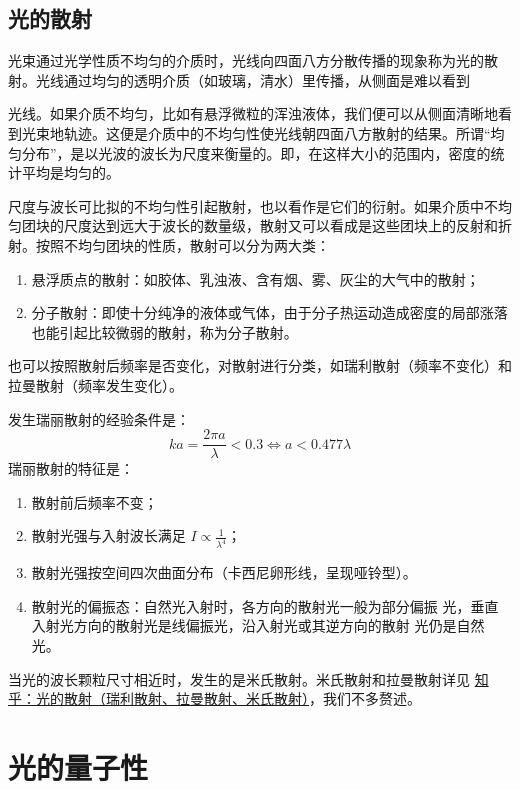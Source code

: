 \documentclass[UTF8]{report}
\theoremstyle{MyLineTheoremStyle} %
\theoremstyle{MyBlockTheoremStyle} %
\theoremstyle{MySubsubsectionStyle} %
\begin{document}
\section{光的散射}

光束通过光学性质不均匀的介质时，光线向四面八方分散传播的现象称为光的散射。光线通过均匀的透明介质（如玻璃，清水）里传播，从侧面是难以看到

光线。如果介质不均匀，比如有悬浮微粒的浑浊液体，我们便可以从侧面清晰地看到光束地轨迹。这便是介质中的不均匀性使光线朝四面八方散射的结果。所谓“均匀分布”，是以光波的波长为尺度来衡量的。即，在这样大小的范围内，密度的统计平均是均匀的。

尺度与波长可比拟的不均匀性引起散射，也以看作是它们的衍射。如果介质中不均匀团块的尺度达到远大于波长的数量级，散射又可以看成是这些团块上的反射和折射。按照不均匀团块的性质，散射可以分为两大类：
\begin{enumerate}
\item 悬浮质点的散射：如胶体、乳浊液、含有烟、雾、灰尘的大气中的散射；
\item 分子散射：即使十分纯净的液体或气体，由于分子热运动造成密度的局部涨落也能引起比较微弱的散射，称为分子散射。
\end{enumerate}
也可以按照散射后频率是否变化，对散射进行分类，如瑞利散射（频率不变化）和拉曼散射（频率发生变化）。

发生瑞丽散射的经验条件是：
\begin{equation}
    ka = \frac{2 \pi a}{\lambda} < 0.3 \Longleftrightarrow 
    a < 0.477 \lambda
\end{equation}
瑞丽散射的特征是：
\begin{enumerate}
\item 散射前后频率不变；
\item 散射光强与入射波长满足 $I \propto \frac{1}{\lambda^4}$；
\item 散射光强按空间四次曲面分布（卡西尼卵形线，呈现哑铃型）。
\item 散射光的偏振态：自然光入射时，各方向的散射光一般为部分偏振
光，垂直入射光方向的散射光是线偏振光，沿入射光或其逆方向的散射
光仍是自然光。
\end{enumerate}
当光的波长颗粒尺寸相近时，发生的是米氏散射。米氏散射和拉曼散射详见 \href{https://zhuanlan.zhihu.com/p/560705804}{知乎：光的散射（瑞利散射、拉曼散射、米氏散射）}，我们不多赘述。

\chapter{光的量子性}\thispagestyle{fancy}
\end{document}
